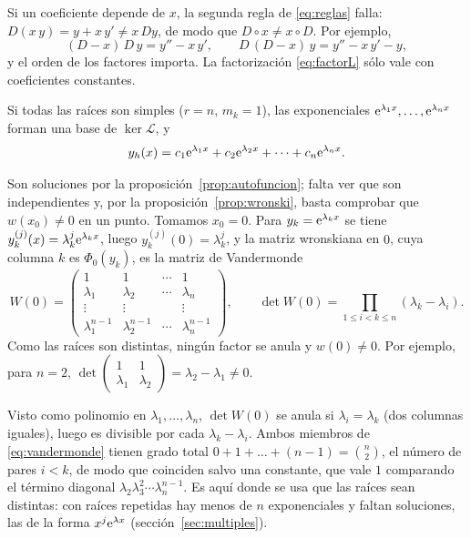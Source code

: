 \documentclass[11pt,twoside]{article}
\newcommand\Lop{\mathcal L}
\newcommand\mat[1]{\begin{pmatrix}#1\end{pmatrix}}
\newcommand\smat[1]{\left(\begin{smallmatrix}#1\end{smallmatrix}\right)}
\begin{document}
\begin{observacion}\label{obs:coefconst}
Si un coeficiente depende de $x$, la segunda regla de \eqref{eq:reglas} falla: $D(x\,y)=y+x\,y'\neq x\,Dy$, de modo que
$D\circ x\neq x\circ D$. Por ejemplo,
\begin{equation*}
(D-x)\,D\,y=y''-x\,y',\qquad D\,(D-x)\,y=y''-x\,y'-y,
\end{equation*}
y el orden de los factores importa. La factorización \eqref{eq:factorL} sólo vale con coeficientes constantes.
\end{observacion}

\begin{corolario}\label{cor:simples}
Si todas las raíces son simples ($r=n$, $m_k=1$), las exponenciales $\mathrm{e}^{\lambda_1x},\dots,\mathrm{e}^{\lambda_nx}$ forman una base
de $\ker\Lop$, y
\begin{equation}\label{eq:yh-simples}
y_h(x)=c_1\mathrm{e}^{\lambda_1x}+c_2\mathrm{e}^{\lambda_2x}+\dots+c_n\mathrm{e}^{\lambda_nx}.
\end{equation}
\end{corolario}

\begin{demostracion}
Son soluciones por la proposición~\ref{prop:autofuncion}; falta ver que son independientes y, por la
proposición~\ref{prop:wronski}, basta comprobar que $w(x_0)\neq0$ en un punto. Tomamos $x_0=0$. Para $y_k=\mathrm{e}^{\lambda_kx}$
se tiene $y_k^{(j)}(x)=\lambda_k^j\mathrm{e}^{\lambda_kx}$, luego $y_k^{(j)}(0)=\lambda_k^j$, y la matriz wronskiana en $0$, cuya
columna $k$ es $\Phi_0(y_k)$, es la matriz de Vandermonde
\begin{equation}\label{eq:vandermonde}
W(0)=\mat{1&1&\cdots&1\\ \lambda_1&\lambda_2&\cdots&\lambda_n\\ \vdots&\vdots&&\vdots\\ \lambda_1^{n-1}&\lambda_2^{n-1}&\cdots&\lambda_n^{n-1}},
\qquad\det W(0)=\prod_{1\le i<k\le n}(\lambda_k-\lambda_i).
\end{equation}
Como las raíces son distintas, ningún factor se anula y $w(0)\neq0$. Por ejemplo, para $n=2$,
$\det\smat{1&1\\ \lambda_1&\lambda_2}=\lambda_2-\lambda_1\neq0$.
\end{demostracion}

\begin{observacion}\label{obs:vandermonde}
Visto como polinomio en $\lambda_1,\dots,\lambda_n$, $\det W(0)$ se anula si $\lambda_i=\lambda_k$ (dos columnas iguales),
luego es divisible por cada $\lambda_k-\lambda_i$. Ambos miembros de \eqref{eq:vandermonde} tienen grado total
$0+1+\dots+(n-1)=\binom n2$, el número de pares $i<k$, de modo que coinciden salvo una constante, que vale $1$ comparando el
término diagonal $\lambda_2\lambda_3^2\cdots\lambda_n^{n-1}$. Es aquí donde se usa que las raíces sean distintas: con
raíces repetidas hay menos de $n$ exponenciales y faltan soluciones, las de la forma $x^j\mathrm{e}^{\lambda x}$
(sección~\ref{sec:multiples}).
\end{observacion}
\end{document}
